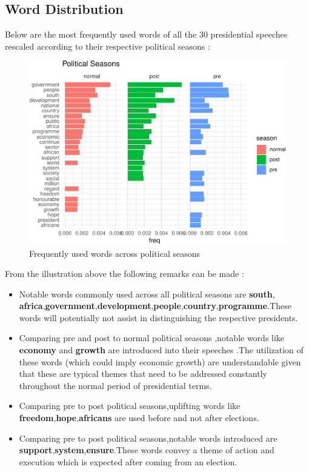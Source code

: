 \documentclass[]{article}
\begin{document}
\newpage

\subsection{Word Distribution}

Below are the most frequently used words of all the 30 presidential
speeches rescaled according to their respective political seasons :

\begin{figure}[H]

{\centering \includegraphics{datasci_fi_Assignment_2_files/figure-latex/eda_season -1} 

}

\caption{Frequently used words across political seasons}\label{fig:eda_season }
\end{figure}

From the illustration above the following remarks can be made :

\begin{itemize}
\item Notable words commonly used across all political seasons are \textbf{south}, \textbf{africa},\textbf{government},\textbf{development},\textbf{people},\textbf{country},\textbf{programme}.These words will potentially not assist in distinguishing the respective presidents.

\item Comparing pre and post to normal political seasons ,notable words like \textbf{economy} and \textbf{growth} are introduced into their speeches .The utilization of these words (which could imply economic growth) are understandable given that these are typical themes that need to be addressed constantly throughout the normal period of presidential terms.

\item Comparing pre to post political seasons,uplifting words like \textbf{freedom},\textbf{hope},\textbf{africans} are used before and not after elections.

\item Comparing pre to post political seasons,notable words introduced are \textbf{support},\textbf{system},\textbf{ensure}.These words convey a theme of action and execution which is expected after coming from an election.

\end{itemize}
\end{document}
